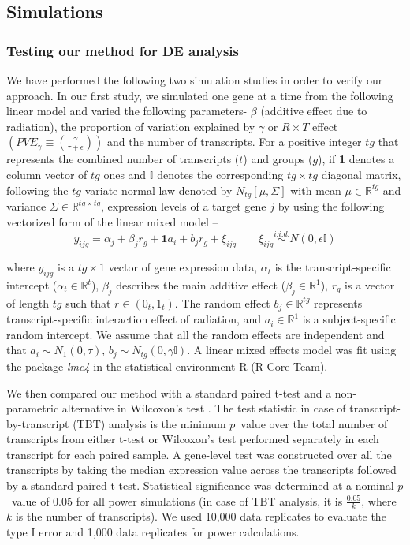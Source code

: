 \documentclass[hidelinks,11pt]{article}
\begin{document}
\subsection*{Simulations}

\subsubsection*{Testing our method for DE analysis}

We have performed the following two simulation studies in order to verify our approach. In our first study, we simulated one gene at a time from the following linear model and varied the following parameters- $\beta$ (additive effect due to radiation), the proportion of variation explained by $\gamma$ or $R \times T$ effect $\left( PVE_{\gamma} \equiv \left(\frac{\gamma}{\tau + \epsilon}\right) \right)$ and the number of transcripts. For a positive integer $tg$ that represents the combined number of transcripts ($t$) and groups ($g$), if \textbf{1} denotes a column vector of $tg$ ones and $\mathbb{I}$ denotes the corresponding $tg \times tg$ diagonal matrix, following the $tg$-variate normal law denoted by $N_{tg}\left[\mu,\Sigma\right]$ with mean $\mu \in \mathbb{R}^{tg}$ and variance $\Sigma \in \mathbb{R}^{tg \times tg}$, expression levels of a target gene $j$ by using the following vectorized form of the linear mixed model --
\begin{equation}
y_{ijg} = \alpha_{j} + \beta_{j} r_{g} + \textbf{1} a_i + b_{j} r_{g} + \xi_{ijg} \qquad \xi_{ijg}  \overset{i.i.d.} \sim N \left( 0, \epsilon\mathbb{I} \right)
\end{equation}

where $y_{ijg}$ is a $tg \times 1$ vector of gene expression data, $\alpha_t$ is the transcript-specific intercept ($\alpha_t \in \mathbb{R}^t$), $\beta_j$ describes the main additive effect ($\beta_j \in \mathbb{R}^1$), $r_g$ is a vector of length $tg$ such that $r \in \left(0_{t},1_{t}\right)$. The random effect $b_j \in \mathbb{R}^{tg}$ represents transcript-specific interaction effect of radiation, and $a_i \in \mathbb{R}^1$ is a subject-specific random intercept. We assume that all the random effects are independent and that $a_i \sim N_1 \left(0, \tau \right)$, $b_j \sim N_{tg} \left(0, \gamma\mathbb{I} \right)$. A linear mixed effects model was fit using the package \emph{lme4}\cite{lme4} in the statistical environment R (R Core Team). 

We then compared our method with a standard paired t-test and a non-parametric alternative in Wilcoxon's test \cite{wilcoxon}. The test statistic in case of transcript-by-transcript (TBT) analysis is the minimum $p$~value over the total number of transcripts from either t-test or Wilcoxon's test performed separately in each transcript for each paired sample. A gene-level test was constructed over all the transcripts by taking the median expression value across the transcripts followed by a standard paired t-test. Statistical significance was determined at a nominal $p$~value of 0.05 for all power simulations (in case of TBT analysis, it is $\frac{0.05}{k}$,  where $k$ is the number of transcripts). We used 10,000 data replicates to evaluate the type I error and 1,000 data replicates for power calculations. 
\end{document}
